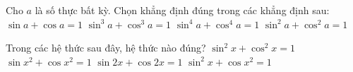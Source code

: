 \begin{ex}
Cho $a$ là số thực bất kỳ. Chọn khẳng định đúng trong các khẳng định sau:
\choice
{$\sin a+\cos a=1$}
{$\sin^3a+\cos^3a=1$}
{$\sin^4a+\cos^4a=1$}
{\True $\sin^2a+\cos^2a=1$}
\end{ex}

\begin{ex}
Trong các hệ thức sau đây, hệ thức nào đúng?
\choice
{\True $\sin^2x+\cos^2x=1$}
{$\sin{x^2}+\cos{x^2}=1$}
{$\sin 2x+\cos 2x=1$}
{$\sin^2x+\cos{x^2}=1$}
\end{ex}
